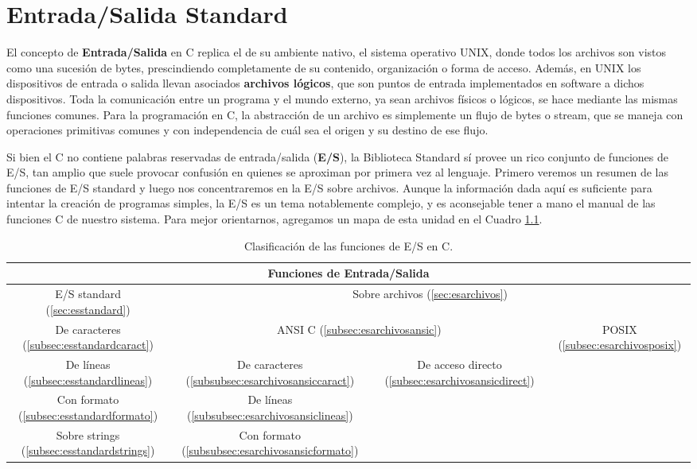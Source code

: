 


\chapter{Entrada/Salida Standard}

El concepto de \textbf{Entrada/Salida} en C replica el de su ambiente nativo, el sistema
operativo UNIX, donde todos los archivos son vistos como una sucesión de bytes,
prescindiendo completamente de su contenido, organización o forma de acceso.
Además, en UNIX los dispositivos de entrada o salida llevan asociados \textbf{archivos
lógicos}, que son puntos de entrada implementados en software a dichos
dispositivos. Toda la comunicación entre un programa y el mundo externo, ya
sean archivos físicos o lógicos, se hace mediante las mismas funciones comunes.
Para la programación en C, la abstracción de un
archivo es simplemente un flujo de bytes o stream, que se maneja con
operaciones primitivas comunes y con independencia de cuál sea el origen y su destino de ese flujo.

Si bien el C no contiene palabras reservadas de entrada/salida (\textbf{E/S}), la
Biblioteca Standard sí provee un rico conjunto de funciones de E/S, tan amplio
que suele provocar confusión en quienes se aproximan por primera vez al
lenguaje. Primero veremos un resumen de las funciones de E/S standard
y luego nos concentraremos en la E/S sobre archivos. Aunque la información dada
aquí es suficiente para intentar la creación de programas simples, la E/S es un
tema notablemente complejo, y es aconsejable tener a mano el manual de las
funciones C de nuestro sistema. Para mejor orientarnos, agregamos un mapa de esta unidad en el Cuadro \ref{tab:mapaes}.


\begin{table}[htbp]
\centering
\begin{tabular}{|c|c|c|c|}
\hline
\multicolumn{4}{|c|}{Funciones de Entrada/Salida}\\
\hline
		E/S standard (\ref{sec:esstandard})& \multicolumn{3}{c|}{Sobre archivos (\ref{sec:esarchivos})}\\
		\hline
		De caracteres (\ref{subsec:esstandardcaract})& \multicolumn{2}{c|}{ANSI C (\ref{subsec:esarchivosansic})}  & POSIX (\ref{subsec:esarchivosposix})\\\cline{2-4}
		De líneas (\ref{subsec:esstandardlineas})& De caracteres (\ref{subsubsec:esarchivosansiccaract})& De acceso directo (\ref{subsec:esarchivosansicdirect})& \\
		Con formato (\ref{subsec:esstandardformato})& De líneas (\ref{subsubsec:esarchivosansiclineas})& & \\
		Sobre strings (\ref{subsec:esstandardstrings})& Con formato (\ref{subsubsec:esarchivosansicformato})& & \\
\hline
\end{tabular}
\caption{Clasificación de las funciones de E/S en C.}
\label{tab:mapaes}
\end{table}


